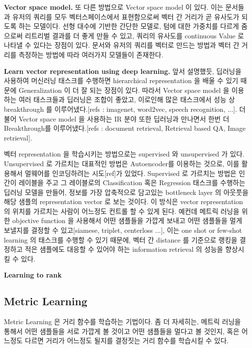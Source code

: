 \textbf{Vector space model.} 또 다른 방법으로 Vector space model 이 있다. 이는 문서들과 유저의 쿼리를 모두 벡터스페이스에서 표현함으로써 벡터 간 거리가 곧 유사도가 되도록 하는 모델이다. 선형 대수에 기반한 간단한 모델로, 텀에 대한 가중치를 다르게 줌으로써 리트리벌 결과를 더 좋게 만들 수 있고, 쿼리의 유사도를 continuous Value 로 나타낼 수 있다는 장점이 있다.\cite{salton1975vector} 문서와 유저의 쿼리를 벡터로 만드는 방법\cite{}과 벡터 간 거리를 측정하는 방법\cite{}에 따라 여러가지 모델들이 존재한다.

\textbf{Learn vector representation using deep learning.} 앞서 설명했듯, 딥러닝을 사용하여 머신러닝 태스크를 수행하면 hierarchical representation 을 배울 수 있기 때문에 Generalization 이 더 잘 되는 장점이 있다. 따라서 Vector space model 을 이용하는 여러 태스크들과 딥러닝은 조합이 좋았고, 이로인해 많은 태스크에서 성능 상 breakthrough 를 이루어냈다.[refs : imagenet, word2vec, speech recognition, ...]. 더불어 Vector space model 을 사용하는 IR 분야 또한 딥러닝과 만나면서 한번 더 Breakthrough를 이루어냈다.[refs : document retrieval, Retrieval based QA, Image retrieval]. 

벡터 representation 을 학습시키는 방법으로는 supervised 와 unsupervised 가 있다. Unsupervised 로 가르치는 대표적인 방법은 Autoencoder를 이용하는 것으로, 이를 활용해서 멀웨어를 인코딩하려는 시도[ref]가 있었다. Supervised 로 가르치는 방법은 인간이 레이블을 주고 그 레이블로의 Classification 혹은 Regression 태스크를 수행하는 딥러닝 모델을 만들어, 정보를 가장 압축적으로 담고있는 bottleneck layer 의 아웃풋을 해당 샘플의 representation vector 로 보는 것이다. 이 방식은 vector representation 의 위치를 가르치는 사람이 어느정도 컨트롤 할 수 있게 된다. 예컨데 메트릭 러닝을 위한 objective function 을 사용해서 어떤 샘플들을 가깝게 보내고 어떤 샘플들을 멀게 보낼지를 결정할 수 있고[siamese, triplet, centerloss ...], 이는 one shot or few-shot learning 의 태스크를 수행할 수 있기 때문에, 벡터 간 distance 를 기준으로 랭킹을 결정하고 적은 샘플에도 대응할 수 있어야 하는 information retrieval 의 성능을 향상시킬 수 있다. 

\textbf{Learning to rank}




\subsection{Metric Learning}
Metric Learning 은 거리 함수를 학습하는 기법이다. 좀 더 자세히는, 메트릭 러닝을 통해서 어떤 샘플들을 서로 가깝게 볼 것이고 어떤 샘플들을 멀다고 볼 것인지, 혹은 어느정도 다르면 거리가 어느정도 될지를 결정짓는 거리 함수를 학습시킬 수 있다. 

